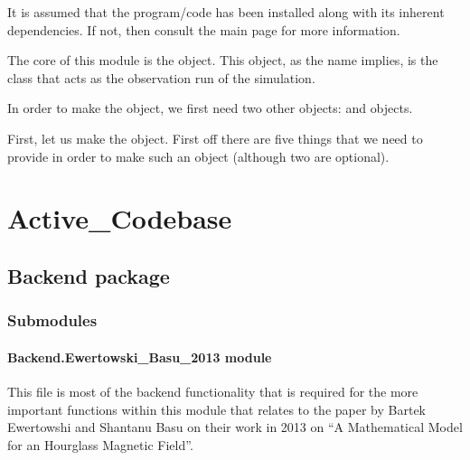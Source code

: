 \documentclass[letterpaper,10pt,english]{sphinxmanual}
\begin{document}
It is assumed that the program/code has been installed along with its inherent dependencies. If not, then consult the main page for more information.

The core of this module is the {\hyperref[\detokenize{model_observing:model_observing.ObservingRun}]{}} object. This object, as the name implies, is the class that acts as the observation run of the simulation.

In order to make the {\hyperref[\detokenize{model_observing:model_observing.ObservingRun}]{}} object, we first need two other objects: {\hyperref[\detokenize{model_observing:model_observing.ProtostarModel}]{}} and {\hyperref[\detokenize{model_observing:model_observing.Sightline}]{}} objects.

First, let us make the {\hyperref[\detokenize{model_observing:model_observing.ProtostarModel}]{}} object. First off there are five things that we need to provide in order to make such an object (although two are optional).


\chapter{Active\_Codebase}
\label{\detokenize{modules:active-codebase}}\label{\detokenize{modules::doc}}

\section{Backend package}
\label{\detokenize{Backend:backend-package}}\label{\detokenize{Backend::doc}}

\subsection{Submodules}
\label{\detokenize{Backend:submodules}}

\subsubsection{Backend.Ewertowski\_Basu\_2013 module}
\label{\detokenize{Backend.Ewertowski_Basu_2013:module-Backend.Ewertowski_Basu_2013}}\label{\detokenize{Backend.Ewertowski_Basu_2013:backend-ewertowski-basu-2013-module}}\label{\detokenize{Backend.Ewertowski_Basu_2013::doc}}
This file is most of the backend functionality that is required for the
more important functions within this module that relates to the paper by
Bartek Ewertowshi and Shantanu Basu on their work in 2013 on “A Mathematical
Model for an Hourglass Magnetic Field”.
\end{document}
